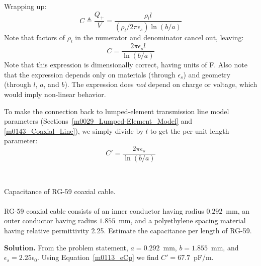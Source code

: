 Wrapping up:
%
\begin{equation}
C \triangleq \frac{Q_+}{V} = \frac{\rho_l l}{ \left( \rho_l / 2\pi \epsilon_s \right) \ln\left(b/a\right) }
\end{equation}
%
Note that factors of $\rho_l$ in the numerator and denominator cancel out, leaving:
%
\begin{equation}
\boxed{
C = \frac{2\pi \epsilon_s l}{\ln\left(b/a\right)}   
}
\end{equation}
%
Note that this expression is dimensionally correct, having units of F. 
Also note that the expression depends only on materials (through $\epsilon_s$) and geometry (through $l$, $a$, and $b$).
The expression does \emph{not} depend on charge or voltage, which would imply non-linear behavior.

To make the connection back to lumped-element transmission line model parameters (Sections~\ref{m0029_Lumped-Element_Model} and \ref{m0143_Coaxial_Line}), we simply divide by $l$ to get the per-unit length parameter:
%
\begin{equation}
\boxed{
C' = \frac{2\pi \epsilon_s}{\ln\left(b/a\right)}   
}
\label{m0113_eCp}
\end{equation}

~\\ \begin{example} 
\begin{mdframed}[backgroundcolor=brown!20,linecolor=brown!20]\raggedright
Capacitance of RG-59 
coaxial cable.
\\~\\
RG-59 coaxial cable consists of an inner conductor having radius $0.292$~mm, an outer conductor having radius $1.855$~mm, and a polyethylene spacing material having relative permittivity 2.25.
Estimate the capacitance per length of RG-59.

{\bf Solution.} 
From the problem statement, 
$a=0.292$~mm, 
$b=1.855$~mm, 
and $\epsilon_s = 2.25\epsilon_0$.
Using Equation~\ref{m0113_eCp} we find $C'=67.7$~pF/m.
\end{mdframed}\end{example}

